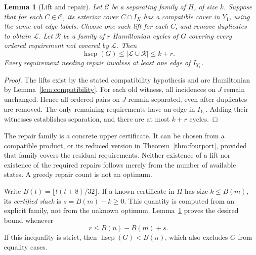 \documentclass[10pt]{article}
\newtheorem{lemma}[theorem]{Lemma}
\newcommand{\hsep}{\operatorname{hsep}}
\begin{document}
\begin{lemma}[Lift and repair]\label{lem:lift}
Let $\mathcal C$ be a separating family of $H$, of size $k$. Suppose that
for each $C\in\mathcal C$, its exterior cover $C\cap I_X$ has a compatible
cover in $Y_1$, using the same cut-edge labels. Choose one such lift for
each $C$, and remove duplicates to obtain $\mathcal L$.
Let $\mathcal R$ be a family of $r$ Hamiltonian cycles of $G$ covering every
ordered requirement not covered by $\mathcal L$. Then
\[
 \hsep(G)\le|\mathcal L\cup\mathcal R|\le k+r.
\]
Every requirement needing repair involves at least one edge of $I_{Y_1}$.
\end{lemma}
\begin{proof}
The lifts exist by the stated compatibility hypothesis and are Hamiltonian
by Lemma~\ref{lem:compatibility}. For each old witness, all incidences on
$J$ remain unchanged. Hence all ordered pairs on $J$ remain separated,
even after duplicates are removed. The only remaining requirements have
an edge in $I_{Y_1}$. Adding their witnesses establishes separation, and
there are at most $k+r$ cycles.
\end{proof}

The repair family is a concrete upper certificate. It can be chosen from a
compatible product, or its reduced version in Theorem~\ref{thm:fourport},
provided that family covers the residual requirements. Neither existence
of a lift nor existence of the required repairs follows merely from the
number of available states. A greedy repair count is not an optimum.

Write $B(t)=\lfloor t(t+8)/32\rfloor$. If a known certificate in $H$ has
size $k\le B(m)$, its \emph{certified slack} is $s=B(m)-k\ge0$. This
quantity is computed from an explicit family, not from the unknown optimum.
Lemma~\ref{lem:lift} proves the desired bound whenever
\begin{equation}\label{eq:budget}
 r\le B(n)-B(m)+s.
\end{equation}
If this inequality is strict, then $\hsep(G)<B(n)$, which also excludes
$G$ from equality cases.
\end{document}
